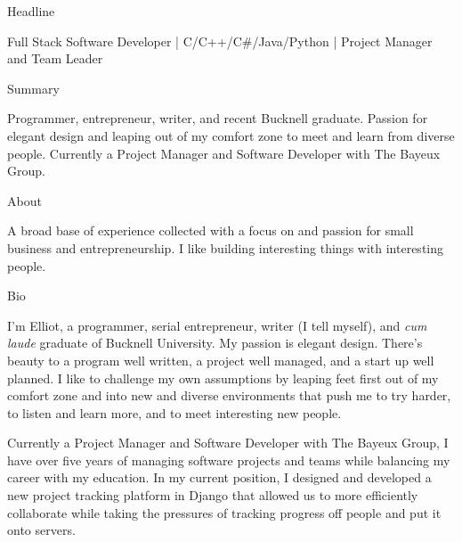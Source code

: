\documentclass{resume} %
\begin{document}

\begin{rSection}{Headline}

Full Stack Software Developer | C/C++/C#/Java/Python | Project Manager and Team Leader \\

\end{rSection}


\begin{rSection}{Summary}

Programmer, entrepreneur, writer, and recent Bucknell graduate. Passion for elegant design and leaping out of my comfort zone to meet and learn from diverse people. Currently a Project Manager and Software Developer with The Bayeux Group.

\end{rSection}

\begin{rSection}{About}

A broad base of experience collected with a focus on and passion for small business and entrepreneurship. I like building interesting things with interesting people. 

\end{rSection}


\begin{rSection}{Bio}

I'm Elliot, a programmer, serial entrepreneur, writer (I tell myself), and \textit{cum laude} graduate of Bucknell University. My passion is elegant design. There's beauty to a program well written, a project well managed, and a start up well planned.  I like to challenge my own assumptions by leaping feet first out of my comfort zone and into new and diverse environments that push me to try harder, to listen and learn more, and to meet interesting new people.

Currently a Project Manager and Software Developer with The Bayeux Group, I have over five years of managing software projects and teams while balancing my career with my education. In my current position, I designed and developed a new project tracking platform in Django that allowed us to more efficiently collaborate while taking the pressures of tracking progress off people and put it onto servers.

\end{rSection}
\end{document}
